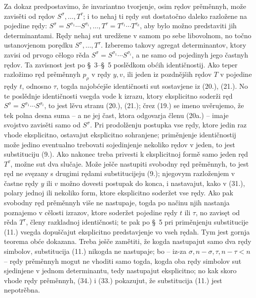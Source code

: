\documentclass[11pt]{article}
\begin{document}
Za dokaz predpostavimo, že invariantno tvorjenje, osim rędov prěměnnyh, može zavisěti od rędov $S^\sigma,\ldots,T^\tau$; i to nehaj ti rędy sut dostatočno daleko razložene na pojedine rędy:
$S^\sigma=S^{\sigma_1}\cdots S^{\sigma_i},\ldots,T^\tau=T^{\tau_1}\cdots T^{\tau_k}$, aby bylo možno predstaviti jih determinantami. Rędy nehaj sut uredžene v samom po sebe libovolnom, no točno ustanovjenom porędku $S^\sigma,\ldots,T^\tau$. Izberemo takovy agregat determinantov, ktory zavisi od prvogo cělogo rěda $S^\sigma=S^{\sigma_1}\cdots S^{\sigma_i}$, a ne samo od pojedinyh jego častnyh rędov. Ta zavisnost jest po \S\ 3--\S\ 5 poslědkom obćih identičnostij. Ako teper razložimo ręd prěměnnyh $p_\rho$ v rędy $y,v$, ili jeden iz pozdnějših rędov $T$ v pojedine rędy $t$, odnosno $\tau$, togda najobćejše identičnosti sut sostavjene iz (20.), (21.). No te poslědnje identičnosti vsegda vode k izrazu, ktory eksplicitno soderži ręd $S^\sigma=S^{\sigma_1}\cdots S^{\sigma_i}$, to jest lěvu stranu (20.), (21.); črez (19.) se imeno uvěrujemo, že tek polna desna suma -- a ne jej čast, ktora odgovarja členu (20a.) -- imaje svojstvo zavisěti samo od $S^\sigma$. Pri prodolženju postupka vse rędy, ktore jedin raz vhode eksplicitno, ostavajut eksplicitno sohranjene; priměnjenje identičnostij može jedino eventualno trebovati sojedinjenje nekoliko rędov v jeden, to jest substituciju (9.). Ako nakonec treba privesti k eksplicitnoj formě samo jeden ręd $T^\tau$, možne sut dva slučaje. Može ješče nastupiti svobodny ręd prěměnnyh, to jest ręd ne svęzany s drugimi rędami substitucijeju (9.); njegovym razloženjem v častne rędy $y$ ili $v$ možno dovesti postupak do konca, i nastavajut, kako v (31.), polary jednoj ili nekoliko form, ktore eksplicitno soderžet vse rędy. Ako pak svobodny ręd prěměnnyh više ne nastupaje, togda po načinu njih nastanja poznajemo v cělosti izrazov, ktore soderžet pojedine rędy $t$ ili $\tau$, no zavisęt od rěda $T^\tau$, členy razkladnoj identičnosti; te pak po \S\ 5 pri priměnjenju substitucije (11.) vsegda dopuščajut eksplicitno predstavjenje vo vseh rędah. Tym jest gornja teorema obće dokazana. Treba ješče zamětiti, že kogda nastupajut samo dva rędy simbolov, substitucija (11.) nikogda ne nastupaje; bo -- iz-za $\sigma,n-\sigma,\tau,n-\tau<n$ -- rędy prěměnnyh mogut ne vhoditi samo togda, kogda oba rędy simbolov sut sjedinjene v jednom determinantu, tedy nastupajut eksplicitno; no kak skoro vhode rędy prěměnnyh, (34.) i (33.) pokazujut, že substitucija (11.) jest nepotrěbna.
\end{document}
